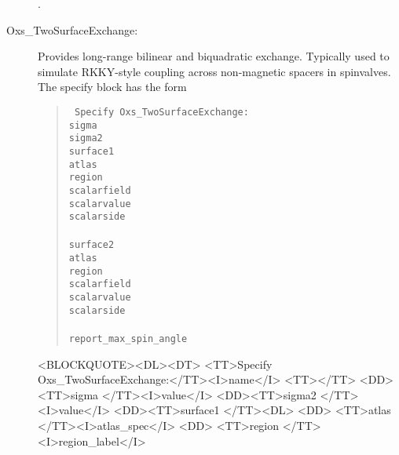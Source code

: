 \begin{description}
   \begin{ExampleMifs}[Example]
     .
   \end{ExampleMifs}


\item[Oxs\_TwoSurfaceExchange:]
%
   Provides long-range bilinear and biquadratic exchange.  Typically
   used to simulate RKKY-style coupling across non-magnetic spacers in
   spinvalves.  The specify block has the form
   \begin{latexonly}
      \begin{quote}\tt
      Specify Oxs\_TwoSurfaceExchange: \ocb\\
        \bi sigma \\
        \bi sigma2 \\
        \bi surface1 \ocb\\
        \bi \bi atlas  \\
        \bi \bi region \\
        \bi \bi scalarfield \\
        \bi \bi scalarvalue \\
        \bi \bi scalarside  \\
        \bi \ccb\\
        \bi surface2 \ocb\\
        \bi \bi atlas  \\
        \bi \bi region \\
        \bi \bi scalarfield \\
        \bi \bi scalarvalue \\
        \bi \bi scalarside  \\
        \bi \ccb\\
      \bi report\_max\_spin\_angle \\
      \ccb
      \end{quote}
   \end{latexonly}
   \begin{rawhtml}
   <BLOCKQUOTE><DL><DT>
   <TT>Specify Oxs_TwoSurfaceExchange:</TT><I>name</I> <TT>{</TT>
   <DD><TT>sigma  </TT><I>value</I>
   <DD><TT>sigma2 </TT><I>value</I>
   <DD><TT>surface1 {</TT><DL>
       <DD> <TT>atlas </TT><I>atlas_spec</I>
       <DD> <TT>region </TT><I>region_label</I>
}}
\end{rawhtml}
\end{description}
